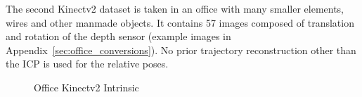 The second Kinectv2 dataset is taken in an office with many smaller elements, wires and other manmade objects.
It contains 57 images composed of translation and rotation of the depth sensor (example images in Appendix~\ref{sec:office_conversions}).
No prior trajectory reconstruction other than the ICP is used for the relative poses.
\begin{figure}[H]
\CenterFloatBoxes%
\begin{floatrow}
{\caption{Office Kinectv2 Intrinsic}\label{tab:office_intrinsic}}%
\end{floatrow}
\end{figure}
